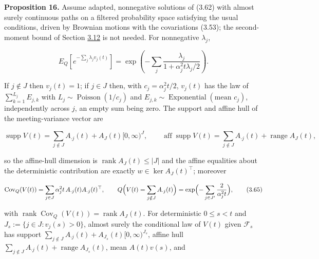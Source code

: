 \documentclass[11pt]{article}
\begin{document}
\label{res:Proposition-16}
\textbf{Proposition 16.} Assume adapted, nonnegative solutions of (3.62) with almost surely continuous paths on a filtered probability space satisfying the usual conditions, driven by Brownian motions with the covariations (3.53); the second-moment bound of Section \hyperref[sec:3.12]{3.12} is not needed. For nonnegative \(\lambda_j\),

\begin{equation*}
E_Q\left[ e^{-\sum_j \lambda_j v_j(t)} \right] = \exp\left( -\sum_j \frac{\lambda_j}{1 + \alpha_j^2 t \lambda_j / 2} \right). \tag{3.63}\label{eq:3.63}
\end{equation*}

If \(j \notin J\) then \(v_j(t) = 1\); if \(j \in J\) then, with \(c_j = \alpha_j^2 t / 2\), \(v_j(t)\) has the law of \(\sum_{k=1}^{L_j} E_{j,k}\) with \(L_j \sim \operatorname{Poisson}(1 / c_j)\) and \(E_{j,k} \sim \operatorname{Exponential}(\text{mean } c_j)\), independently across \(j\), an empty sum being zero. The support and affine hull of the meeting-variance vector are

\begin{equation*}
\operatorname{supp} V(t) = \sum_{j \notin J} A_{\cdot j}(t) + A_J(t)[0, \infty)^J, \qquad \operatorname{aff} \operatorname{supp} V(t) = \sum_{j \notin J} A_{\cdot j}(t) + \operatorname{range} A_J(t), \tag{3.64}\label{eq:3.64}
\end{equation*}

so the affine-hull dimension is \(\operatorname{rank} A_J(t) \le |J|\) and the affine equalities about the deterministic contribution are exactly \(w \in \ker A_J(t)^\top\); moreover

\begin{equation*}
\operatorname{Cov}_Q(V(t)) = \sum_{j \in J} \alpha_j^2 t\, A_{\cdot j}(t) A_{\cdot j}(t)^\top, \qquad Q\Bigl( V(t) = \sum_{j \notin J} A_{\cdot j}(t) \Bigr) = \exp\Bigl( -\sum_{j \in J'} \frac{2}{\alpha_j^2 t} \Bigr), \tag{3.65}\label{eq:3.65}
\end{equation*}

with \(\operatorname{rank} \operatorname{Cov}_Q(V(t)) = \operatorname{rank} A_J(t)\). For deterministic \(0 \le s < t\) and \(J_s := \{j \in J : v_j(s) > 0\}\), almost surely the conditional law of \(V(t)\) given \(\mathcal F_s\) has support \(\sum_{j \notin J} A_{\cdot j}(t) + A_{J_s}(t)[0, \infty)^{J_s}\), affine hull \(\sum_{j \notin J} A_{\cdot j}(t) + \operatorname{range} A_{J_s}(t)\), mean \(A(t) v(s)\), and
\end{document}
